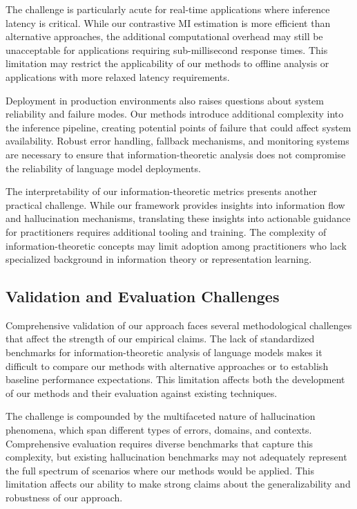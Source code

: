 The challenge is particularly acute for real-time applications where inference latency is critical. While our contrastive MI estimation is more efficient than alternative approaches, the additional computational overhead may still be unacceptable for applications requiring sub-millisecond response times. This limitation may restrict the applicability of our methods to offline analysis or applications with more relaxed latency requirements.

Deployment in production environments also raises questions about system reliability and failure modes. Our methods introduce additional complexity into the inference pipeline, creating potential points of failure that could affect system availability. Robust error handling, fallback mechanisms, and monitoring systems are necessary to ensure that information-theoretic analysis does not compromise the reliability of language model deployments.

The interpretability of our information-theoretic metrics presents another practical challenge. While our framework provides insights into information flow and hallucination mechanisms, translating these insights into actionable guidance for practitioners requires additional tooling and training. The complexity of information-theoretic concepts may limit adoption among practitioners who lack specialized background in information theory or representation learning.

\subsection{Validation and Evaluation Challenges}

Comprehensive validation of our approach faces several methodological challenges that affect the strength of our empirical claims. The lack of standardized benchmarks for information-theoretic analysis of language models makes it difficult to compare our methods with alternative approaches or to establish baseline performance expectations. This limitation affects both the development of our methods and their evaluation against existing techniques.

The challenge is compounded by the multifaceted nature of hallucination phenomena, which span different types of errors, domains, and contexts. Comprehensive evaluation requires diverse benchmarks that capture this complexity, but existing hallucination benchmarks may not adequately represent the full spectrum of scenarios where our methods would be applied. This limitation affects our ability to make strong claims about the generalizability and robustness of our approach.

